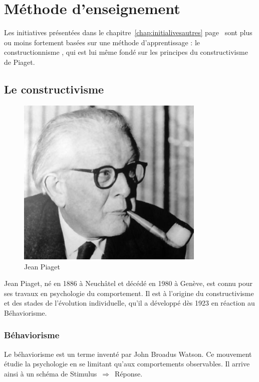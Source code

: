 \section{Méthode d'enseignement}

Les initiatives présentées dans le chapitre~\ref{chap:initialivesautres} page~\pageref{chap:initialivesautres} sont plus ou moins fortement basées sur une méthode d'apprentissage : le \og constructionnisme \fg{}, qui est lui même fondé sur les principes du constructivisme de Piaget.

\subsection{Le constructivisme}
\begin{minipage}[H]{0.3\linewidth}
  \begin{figure}[H]
  \centering
  \includegraphics[width=0.8\textwidth]{../resources/illustrations/piaget}
  \caption{Jean Piaget}
  \end{figure}
\end{minipage}
\begin{minipage}[H]{0.7\linewidth}
Jean Piaget, né en 1886 à Neuchâtel et décédé en 1980 à Genève, est connu pour ses travaux en psychologie du comportement. Il est à l'origine du constructivisme et des stades de l'évolution individuelle, qu'il a développé dès 1923 en réaction au Béhaviorisme\cite{wikipedia_piaget}.
\vspace{.8cm}
\end{minipage}

\subsubsection{Béhaviorisme}
Le béhaviorisme est un terme inventé par John Broadus Watson. Ce mouvement étudie la psychologie en se limitant qu'aux comportements observables. Il arrive ainsi à un schéma de Stimulus~$\Rightarrow$~Réponse.

